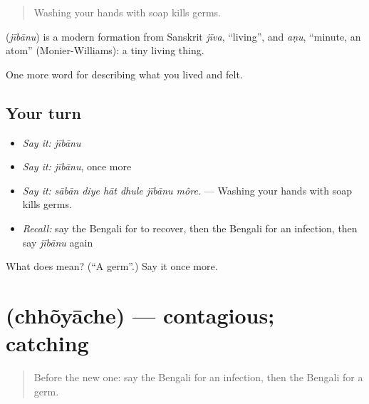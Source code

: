 \begin{quote}
Washing your hands with soap kills germs.
\end{quote}

\begin{cousinweb}
\textbf{} (\emph{jībānu}) is a modern formation from Sanskrit \emph{jīva}, \textquotedblleft{}living\textquotedblright{}, and \emph{aṇu}, \textquotedblleft{}minute, an atom\textquotedblright{} (Monier-Williams): a tiny living thing.
\end{cousinweb}

\begin{grammarlens}[title={What you've built}]
One more word for describing what you lived and felt.
\end{grammarlens}

\subsection*{Your turn}
\begin{itemize}
\raggedright
  \item \emph{Say it:} \emph{jībānu}
  \item \emph{Say it:} \emph{jībānu}, once more
  \item \emph{Say it:} \emph{sābān diye hāt dhule jībānu môre.} — Washing your hands with soap kills germs.
  \item \emph{Recall:} say the Bengali for to recover, then the Bengali for an infection, then say \emph{jībānu} again
\end{itemize}

\begin{tcolorbox}[breakable,colback=teal!4,colframe=teal!35!black,title={Before you move on}]
What does  mean? (\textquotedblleft{}A germ\textquotedblright{}.) Say it once more.
\end{tcolorbox}
\section[\texorpdfstring{\bn{ছোঁয়াচে} (chhõyāche)}{ছোঁয়াচে (chhõyāche)}]{ (chhõyāche) — contagious; catching}

\label{lesson:BN-C473-chhoyache}



\begin{quote}
Before the new one: say the Bengali for an infection, then the Bengali for a germ.
\end{quote}

